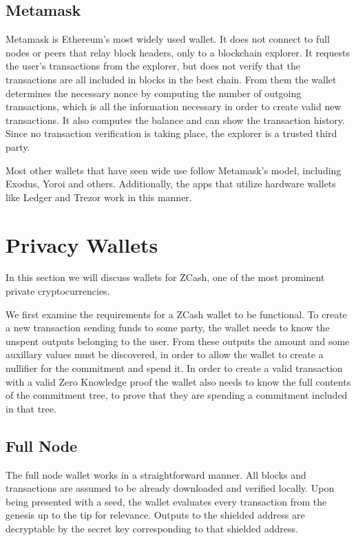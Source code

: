 \documentclass[sigconf]{acmart}
\begin{document}
\subsection{Metamask}
Metamask is Ethereum's most widely used wallet. It does not connect to full nodes or peers that relay block headers, only to a blockchain explorer. It requests the user's transactions from the explorer, but does not verify that the transactions are all included in blocks in the best chain. From them the wallet determines the necessary nonce by computing the number of outgoing transactions, which is all the information necessary in order to create valid new transactions. It also computes the balance and can show the transaction history. Since no transaction verification is taking place, the explorer is a trusted third party.

Most other wallets that have seen wide use follow Metamask's model, including Exodus, Yoroi and others. Additionally, the apps that utilize hardware wallets like Ledger and Trezor work in this manner.

\section{Privacy Wallets}
In this section we will discuss wallets for ZCash, one of the most prominent private cryptocurrencies.

We first examine the requirements for a ZCash wallet to be functional. To create a new transaction sending funds to some party, the wallet needs to know the unspent outputs belonging to the user. From these outputs the amount and some auxillary values must be discovered, in order to allow the wallet to create a nullifier for the commitment and spend it. In order to create a valid transaction with a valid Zero Knowledge proof the wallet also needs to know the full contents of the commitment tree, to prove that they are spending a commitment included in that tree.

\subsection{Full Node}
The full node wallet works in a straightforward manner. All blocks and transactions are assumed to be already downloaded and verified locally. Upon being presented with a seed, the wallet evaluates every transaction from the genesis up to the tip for relevance. Outputs to the shielded address are decryptable by the secret key corresponding to that shielded address.
\end{document}
